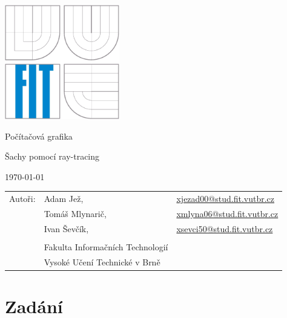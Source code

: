 \documentclass[12pt,a4paper,titlepage,final]{report}
\makeatletter
\newcommand\Course{Počítačová grafika}
\newcommand\WorkTitle{Šachy pomocí ray-tracing}
\newcommand\AuthorA{Adam Jež}
\newcommand\AuthorAEmail{xjezad00@stud.fit.vutbr.cz}
\newcommand\AuthorB{Tomáš Mlynarič}
\newcommand\AuthorBEmail{xmlyna06@stud.fit.vutbr.cz}
\newcommand\AuthorC{Ivan Ševčík}
\newcommand\AuthorCEmail{xsevci50@stud.fit.vutbr.cz}
\newcommand\Faculty{Fakulta Informačních Technologií}
\newcommand\School{Vysoké Učení Technické v Brně}
\makeatother
\begin{document}
	\begin{titlepage}
	\begin{center}
		\includegraphics[height=5cm]{images/logo.eps}
	\end{center}
	\vfill
	\begin{center}
		\begin{Large}
			\Course\\
		\end{Large}
		\bigskip
		\begin{Huge}
			\WorkTitle\\
		\end{Huge}
	\end{center}
	\vfill
	\begin{center}
		\begin{large}
			\today
		\end{large}
	\end{center}
	\vfill
	\begin{flushleft}
		\begin{large}
			\begin{tabular}{lll}
				Autoři: & \AuthorA, & \url{\AuthorAEmail} \\
				        & \AuthorB, & \url{\AuthorBEmail} \\
				        & \AuthorC, & \url{\AuthorCEmail} \\
				& & \\
				& \Faculty \\
				& \School \\
			\end{tabular}
		\end{large}
	\end{flushleft}
\end{titlepage}		
	
	
\tableofcontents

\newpage
\chapter{Zadání}
\end{document}
